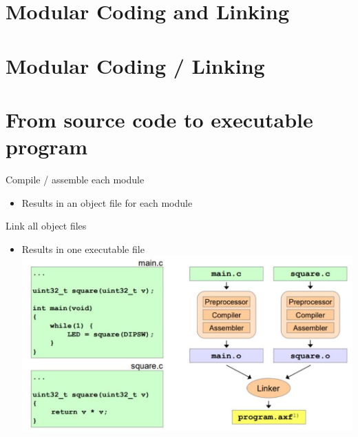 \section{Modular Coding and Linking}

\section*{Modular Coding / Linking}
\section*{From source code to executable program}
Compile / assemble each module

\begin{itemize}
  \item Results in an object file for each module
\end{itemize}

Link all object files

\begin{itemize}
  \item Results in one executable file\\
\includegraphics[width=\linewidth]{images/2024_12_29_79e6b22f503fb7b4f718g-10(2)}
\end{itemize}

